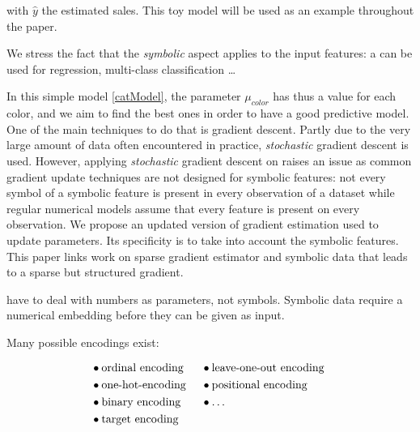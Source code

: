  with $\hat{y}$ the estimated sales. This toy model will be used as an example throughout the paper.

We stress the fact that the \textit{symbolic} aspect applies to the input features: a \catmod can be used for regression, multi-class classification \dots

In this simple model \ref{catModel}, the parameter $\mu_{color}$ has thus a value for each color, and we aim to find the best ones in order to have a good predictive model. One of the main techniques to do that is gradient descent. Partly due to the very large amount of data often encountered in practice, \textit{stochastic} gradient descent is used. However, applying \textit{stochastic} gradient descent on \catmod raises an issue as common gradient update techniques are not designed for symbolic features: not every symbol of a symbolic feature is present in every observation of a dataset while regular numerical models assume that every feature is present on every observation. We propose an updated version of gradient estimation used to update parameters. Its specificity is to take into account the symbolic features. This paper links work on sparse gradient estimator and \ohe symbolic data that leads to a sparse but structured gradient.






\catmod have to deal with numbers as parameters, not symbols. Symbolic data require a numerical embedding before they can be given as input.




Many possible encodings exist:
\begin{fleqn}
\begin{align*}
    &\bullet \text{ordinal encoding} &&\bullet \text{leave-one-out encoding}\\
    &\bullet \text{\text{one-hot-encoding }}             &&\bullet \text{positional encoding} \quad \quad \\
    &\bullet \text{binary encoding}  &&\bullet \text{\dots}\\
    &\bullet \text{target encoding}  && \\
\end{align*}
\end{fleqn}


